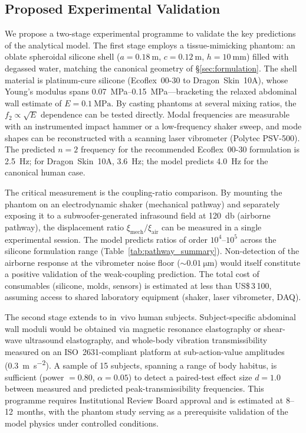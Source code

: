 \subsection{Proposed Experimental Validation}
\label{sec:disc:validation}

We propose a two-stage experimental programme to validate the key
predictions of the analytical model.  The first stage employs a
tissue-mimicking phantom: an oblate spheroidal silicone shell
($a = \SI{0.18}{\metre}$, $c = \SI{0.12}{\metre}$, $h = \SI{10}{\milli\metre}$)
filled with degassed water, matching the canonical geometry of
\S\ref{sec:formulation}.  The shell material is platinum-cure silicone
(Ecoflex~00-30 to Dragon~Skin~10A), whose Young's modulus spans
\SIrange{0.07}{0.15}{\mega\pascal}---bracketing the relaxed abdominal wall
estimate of $E = \SI{0.1}{\mega\pascal}$.  By casting phantoms at several
mixing ratios, the $f_2 \propto \sqrt{E}$ dependence can be tested
directly.  Modal frequencies are measurable with an instrumented impact
hammer or a low-frequency shaker sweep, and mode shapes can be
reconstructed with a scanning laser vibrometer (Polytec PSV-500).
The predicted $n = 2$ frequency for the recommended Ecoflex~00-30
formulation is \SI{2.5}{\hertz}; for Dragon~Skin~10A,
\SI{3.6}{\hertz}; the model predicts \SI{4.0}{\hertz} for the
canonical human case.

The critical measurement is the coupling-ratio comparison.  By mounting
the phantom on an electrodynamic shaker (mechanical pathway) and
separately exposing it to a subwoofer-generated infrasound field at
\SI{120}{\decibel} (airborne pathway), the displacement ratio
$\xi_{\mathrm{mech}} / \xi_{\mathrm{air}}$ can be measured in a single
experimental session.  The model predicts ratios of order $10^4$--$10^5$
across the silicone formulation range (Table~\ref{tab:pathway_summary}).
Non-detection of the airborne response at the vibrometer noise floor
($\sim\SI{0.01}{\micro\metre}$) would itself constitute a positive
validation of the weak-coupling prediction.  The total cost of consumables
(silicone, molds, sensors) is estimated at less than US\$\,3\,100, assuming
access to shared laboratory equipment (shaker, laser vibrometer, DAQ).

The second stage extends to in~vivo human subjects.  Subject-specific
abdominal wall moduli would be obtained via magnetic resonance elastography
or shear-wave ultrasound elastography, and whole-body vibration
transmissibility measured on an ISO~2631-compliant platform at sub-action-value
amplitudes (\SI{0.3}{\metre\per\second\squared}).  A sample of 15 subjects,
spanning a range of body habitus, is sufficient (power $= 0.80$,
$\alpha = 0.05$) to detect a paired-test effect size $d = 1.0$ between
measured and predicted peak-transmissibility frequencies.  This programme
requires Institutional Review Board approval and is estimated at
8--12~months, with the phantom study serving as a prerequisite validation of
the model physics under controlled conditions.
